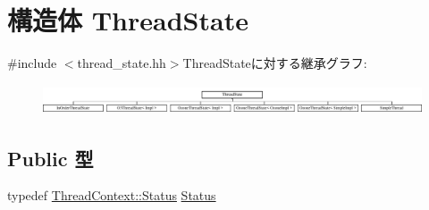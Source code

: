 \hypertarget{structThreadState}{
\section{構造体 ThreadState}
\label{structThreadState}
}


{\ttfamily \#include $<$thread\_\-state.hh$>$}ThreadStateに対する継承グラフ:\begin{figure}[H]
\begin{center}
\leavevmode
\includegraphics[height=0.897436cm]{structThreadState}
\end{center}
\end{figure}
\subsection*{Public 型}
\begin{DoxyCompactItemize}
\item 
typedef \hyperlink{classThreadContext_a67a0db04d321a74b7e7fcfd3f1a3f70b}{ThreadContext::Status} \hyperlink{structThreadState_a3af29dcea6d2bbb0a1de56f02ec789f1}{Status}
\end{DoxyCompactItemize}
